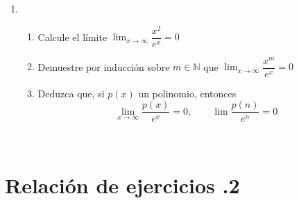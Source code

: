 \begin{enumerate}
\item
\begin{enumerate}
\item
Calcule el límite $\displaystyle\lim_{x\to\infty}\dfrac{x^2}{e^x}=0$

\item
Demuestre por inducción sobre $m\in\mathbb{N}$ que $\displaystyle\lim_{x\to\infty}\dfrac{x^m}{e^x}=0$
\item
Deduzca que, si $p(x)$ un polinomio, entonces
\[
\lim_{x\to\infty} \dfrac{p(x)}{e^x}=0,\qquad
\lim \dfrac{p(n)}{e^n}=0
\]
\end{enumerate}

\end{enumerate}

\newpage

\ 

\newpage

\section*{Relación de ejercicios \thechapter.2}

\pagestyle{relaciones}

